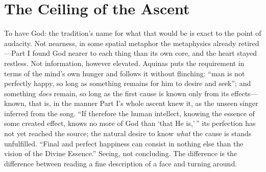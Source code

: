 \section{The Ceiling of the Ascent}

To have God: the tradition's name for what that would be is exact to the point of audacity. Not nearness, in some spatial metaphor the metaphysics already retired---Part I found God nearer to each thing than its own core, and the heart stayed restless. Not information, however elevated. Aquinas puts the requirement in terms of the mind's own hunger and follows it without flinching: ``man is not perfectly happy, so long as something remains for him to desire and seek''; and something \emph{does} remain, so long as the first cause is known only from its effects---known, that is, in the manner Part I's whole ascent knew it, as the unseen singer inferred from the song. ``If therefore the human intellect, knowing the essence of some created effect, knows no more of God than `that He is,'\,'' its perfection has not yet reached the source; the natural desire to know \emph{what} the cause is stands unfulfilled. ``Final and perfect happiness can consist in nothing else than the vision of the Divine Essence.'' Seeing, not concluding. The difference is the difference between reading a fine description of a face and turning around.

